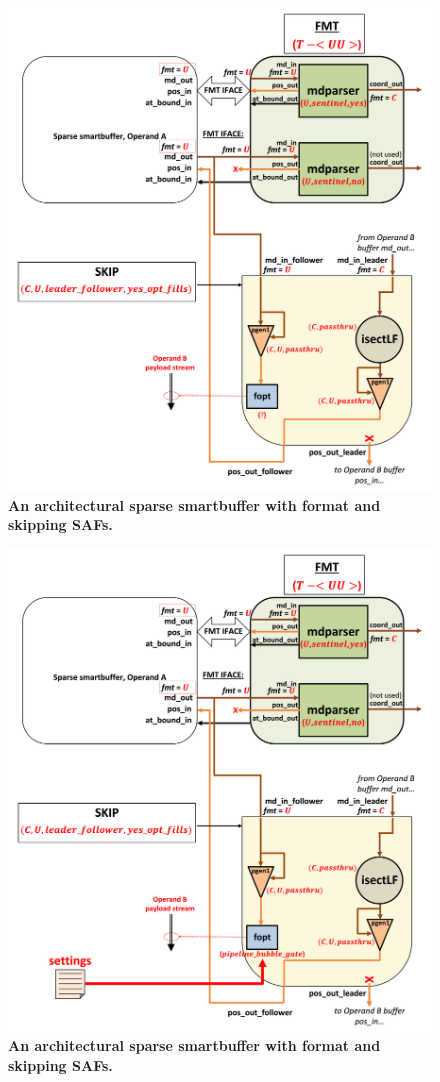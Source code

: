 \begin{figure}[H]
\includegraphics[width=\textwidth]{figures/safinference_build_12isectlfpgenoneopt.png}
\caption{\textbf{An architectural sparse smartbuffer with format and skipping SAFs.}}
\label{fig:safinference_build_12isectlfpgenoneopt}
\centering
\end{figure}

\begin{figure}[H]
\includegraphics[width=\textwidth]{figures/safinference_build_13foptstratcust.png}
\caption{\textbf{An architectural sparse smartbuffer with format and skipping SAFs.}}
\label{fig:safinference_build_13foptstratcust}
\centering
\end{figure}